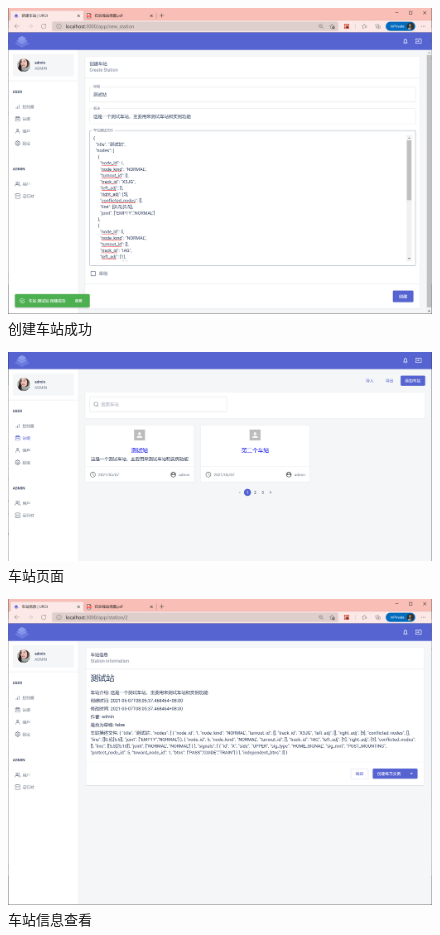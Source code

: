 \begin{figure}[htbp!]
    \centering
    \includegraphics[width=\textwidth]{figures/png/create_sta_succ.png}
    \caption{\label{create_sta_succ}创建车站成功}
\end{figure}

\begin{figure}[htbp!]
    \centering
    \includegraphics[width=\textwidth]{figures/png/station_list.png}
    \caption{\label{station_list}车站页面}
\end{figure}

\begin{figure}[htbp!]
    \centering
    \includegraphics[width=\textwidth]{figures/png/station_info.png}
    \caption{\label{station_info}车站信息查看}
\end{figure}

